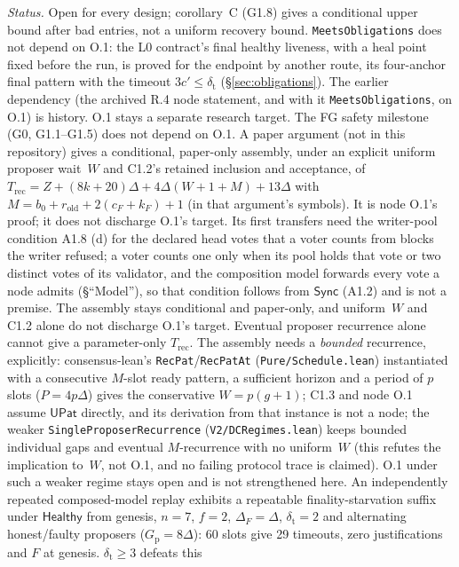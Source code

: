 \documentclass{article}
\newcommand{\cF}{c_F}
\begin{document}
\emph{Status.}  Open for every design;
corollary~C (G1.8) gives a conditional upper bound after bad entries, not a
uniform recovery bound.  \texttt{MeetsObligations} does not depend on O.1: the L0
contract's final healthy liveness, with a heal point fixed before the run,
is proved for the endpoint by another route, its four-anchor final pattern
with the timeout $3c'\leq\delta_{\mathrm t}$ (\S\ref{sec:obligations}).  The
earlier dependency (the archived R.4 node statement, and with it \texttt{MeetsObligations}, on O.1) is history.  O.1 stays a separate research target.
The FG safety milestone (G0, G1.1--G1.5) does not
depend on O.1.  A paper argument (not in this repository)
gives a conditional, paper-only assembly, under an explicit uniform proposer
wait~$W$ and C1.2's retained inclusion and acceptance, of
$T_{\mathrm{rec}}=Z+(8k+20)\Delta+4\Delta(W+1+M)+13\Delta$ with
$M=b_0+r_{\mathrm{old}}+2(\cF+k_F)+1$ (in that argument's symbols).  It is node O.1's
proof; it does not discharge O.1's target.  Its first transfers
need the writer-pool condition A1.8 (d) for the declared head votes that a
voter counts from blocks the writer refused; a voter counts one only when its
pool holds that vote or two distinct votes of its validator, and the
composition model forwards every vote a node admits (\S``Model''), so that
condition follows from $\mathsf{Sync}$ (A1.2) and is not a premise.  The
assembly stays conditional and paper-only, and uniform~$W$ and C1.2 alone do
not discharge O.1's target.  Eventual proposer
recurrence alone cannot give a parameter-only $T_{\mathrm{rec}}$.  The
assembly needs a \emph{bounded} recurrence, explicitly: consensus-lean's
\texttt{RecPat}/\texttt{RecPatAt} (\texttt{Pure/Schedule.lean}) instantiated
with a consecutive $M$-slot ready pattern, a sufficient horizon and a
period of $p$ slots ($P=4p\Delta$) gives the conservative $W=p(g+1)$; C1.3 and node O.1 assume
$\mathsf{UPat}$ directly, and its derivation from that instance is not a node; the weaker \texttt{SingleProposerRecurrence}
(\texttt{V2/DCRegimes.lean}) keeps bounded individual gaps and eventual
$M$-recurrence with no uniform~$W$ (this refutes the implication to~$W$, not O.1, and no failing
protocol trace is claimed).  O.1 under such a weaker regime stays open and is
not strengthened here.  An independently repeated composed-model replay exhibits a
repeatable finality-starvation suffix under $\mathsf{Healthy}$ from genesis,
$n=7$, $f=2$, $\Delta_F=\Delta$, $\delta_{\mathrm t}=2$ and alternating
honest/faulty proposers ($G_{\mathrm p}=8\Delta$): 60 slots give 29 timeouts,
zero justifications and $F$ at genesis.  $\delta_{\mathrm t}\geq3$ defeats this
\end{document}
